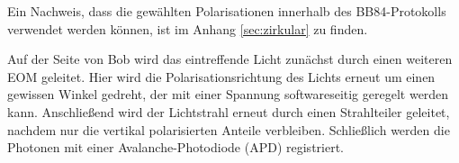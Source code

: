 Ein Nachweis, dass die gewählten Polarisationen innerhalb des BB84-Protokolls
verwendet werden können, ist im Anhang \ref{sec:zirkular} zu finden.

Auf der Seite von Bob wird das eintreffende Licht zunächst durch einen weiteren
EOM geleitet. Hier wird die Polarisationsrichtung des Lichts erneut um einen
gewissen Winkel gedreht, der mit einer Spannung softwareseitig geregelt werden
kann. Anschließend wird der Lichtstrahl erneut durch einen Strahlteiler
geleitet, nachdem nur die vertikal polarisierten Anteile verbleiben.
Schließlich werden die Photonen mit einer Avalanche-Photodiode (APD)
registriert.
